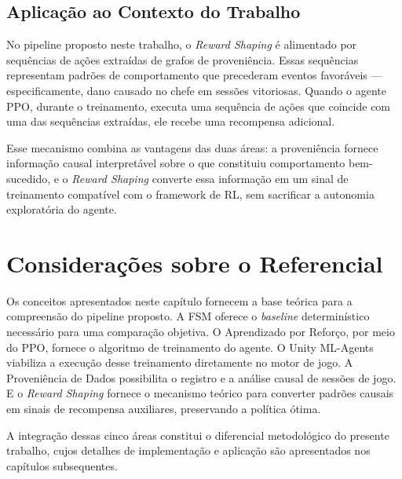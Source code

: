 \subsection{Aplicação ao Contexto do Trabalho}
\label{subsec:shaping-aplicacao}

No pipeline proposto neste trabalho, o \textit{Reward Shaping} é alimentado
por sequências de ações extraídas de grafos de proveniência. Essas sequências
representam padrões de comportamento que precederam eventos favoráveis ---
especificamente, dano causado no chefe em sessões vitoriosas. Quando o agente
PPO, durante o treinamento, executa uma sequência de ações que coincide com
uma das sequências extraídas, ele recebe uma recompensa adicional.

Esse mecanismo combina as vantagens das duas áreas: a proveniência fornece
informação causal interpretável sobre o que constituiu comportamento bem-
sucedido, e o \textit{Reward Shaping} converte essa informação em um sinal
de treinamento compatível com o framework de RL, sem sacrificar a autonomia
exploratória do agente.

\section{Considerações sobre o Referencial}
\label{sec:consideracoes-referencial}

Os conceitos apresentados neste capítulo fornecem a base teórica para a
compreensão do pipeline proposto. A FSM oferece o \textit{baseline}
determinístico necessário para uma comparação objetiva. O Aprendizado por
Reforço, por meio do PPO, fornece o algoritmo de treinamento do agente. O
Unity ML-Agents viabiliza a execução desse treinamento diretamente no motor
de jogo. A Proveniência de Dados possibilita o registro e a análise causal
de sessões de jogo. E o \textit{Reward Shaping} fornece o mecanismo teórico
para converter padrões causais em sinais de recompensa auxiliares, preservando
a política ótima.

A integração dessas cinco áreas constitui o diferencial metodológico do
presente trabalho, cujos detalhes de implementação e aplicação são
apresentados nos capítulos subsequentes.
